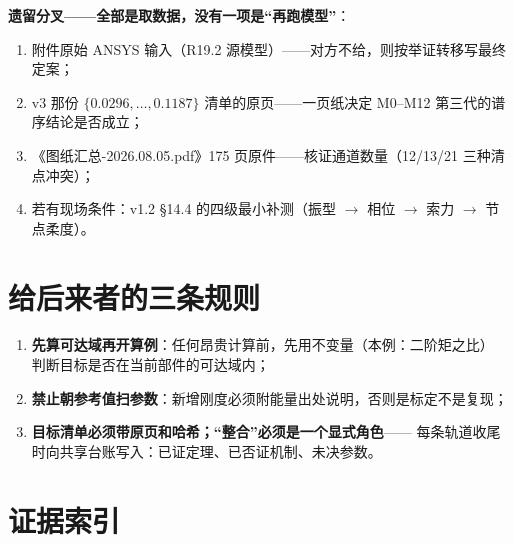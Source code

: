 \documentclass[11pt,a4paper]{ctexart}
\begin{document}
\textbf{遗留分叉——全部是取数据，没有一项是``再跑模型''}：

\begin{enumerate}
  \item 附件原始 ANSYS 输入（R19.2 源模型）——对方不给，则按举证转移写最终定案；
  \item v3 那份 $\{0.0296,\ldots,0.1187\}$ 清单的原页——一页纸决定 M0--M12
        第三代的谱序结论是否成立；
  \item 《图纸汇总-2026.08.05.pdf》175 页原件——核证通道数量（12/13/21 三种清点冲突）；
  \item 若有现场条件：v1.2 §14.4 的四级最小补测（振型 $\to$ 相位 $\to$ 索力 $\to$ 节点柔度）。
\end{enumerate}

\section{给后来者的三条规则}

\begin{enumerate}
  \item \textbf{先算可达域再开算例}：任何昂贵计算前，先用不变量（本例：二阶矩之比）
        判断目标是否在当前部件的可达域内；
  \item \textbf{禁止朝参考值扫参数}：新增刚度必须附能量出处说明，否则是标定不是复现；
  \item \textbf{目标清单必须带原页和哈希；``整合''必须是一个显式角色}——
        每条轨道收尾时向共享台账写入：已证定理、已否证机制、未决参数。
\end{enumerate}

\appendix
\section{证据索引}
\end{document}

